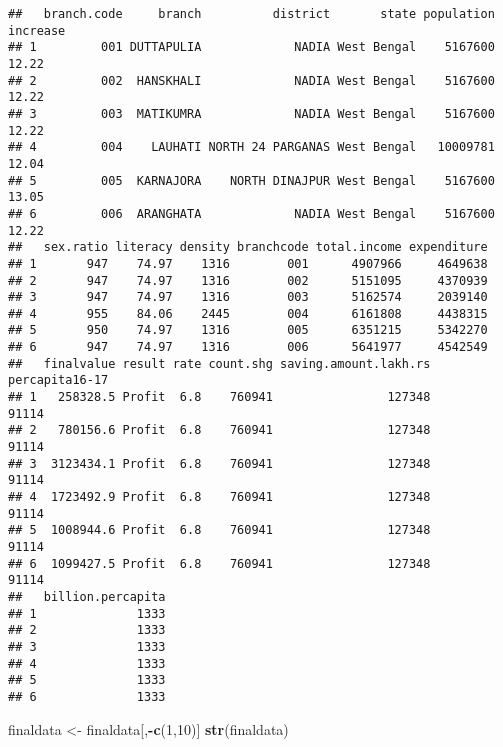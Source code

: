 \documentclass[]{article}
\newenvironment{Shaded}{\begin{snugshade}}{\end{snugshade}}
\newcommand{\KeywordTok}[1]{\textcolor[rgb]{0.13,0.29,0.53}{\textbf{#1}}}
\newcommand{\DecValTok}[1]{\textcolor[rgb]{0.00,0.00,0.81}{#1}}
\newcommand{\StringTok}[1]{\textcolor[rgb]{0.31,0.60,0.02}{#1}}
\newcommand{\OperatorTok}[1]{\textcolor[rgb]{0.81,0.36,0.00}{\textbf{#1}}}
\newcommand{\NormalTok}[1]{#1}
\begin{document}
\begin{verbatim}
##   branch.code     branch          district       state population increase
## 1         001 DUTTAPULIA             NADIA West Bengal    5167600    12.22
## 2         002  HANSKHALI             NADIA West Bengal    5167600    12.22
## 3         003  MATIKUMRA             NADIA West Bengal    5167600    12.22
## 4         004    LAUHATI NORTH 24 PARGANAS West Bengal   10009781    12.04
## 5         005  KARNAJORA    NORTH DINAJPUR West Bengal    5167600    13.05
## 6         006  ARANGHATA             NADIA West Bengal    5167600    12.22
##   sex.ratio literacy density branchcode total.income expenditure
## 1       947    74.97    1316        001      4907966     4649638
## 2       947    74.97    1316        002      5151095     4370939
## 3       947    74.97    1316        003      5162574     2039140
## 4       955    84.06    2445        004      6161808     4438315
## 5       950    74.97    1316        005      6351215     5342270
## 6       947    74.97    1316        006      5641977     4542549
##   finalvalue result rate count.shg saving.amount.lakh.rs percapita16-17
## 1   258328.5 Profit  6.8    760941                127348          91114
## 2   780156.6 Profit  6.8    760941                127348          91114
## 3  3123434.1 Profit  6.8    760941                127348          91114
## 4  1723492.9 Profit  6.8    760941                127348          91114
## 5  1008944.6 Profit  6.8    760941                127348          91114
## 6  1099427.5 Profit  6.8    760941                127348          91114
##   billion.percapita
## 1              1333
## 2              1333
## 3              1333
## 4              1333
## 5              1333
## 6              1333
\end{verbatim}

\begin{Shaded}
\begin{Highlighting}[]
\NormalTok{finaldata <-}\StringTok{ }\NormalTok{finaldata[,}\OperatorTok{-}\KeywordTok{c}\NormalTok{(}\DecValTok{1}\NormalTok{,}\DecValTok{10}\NormalTok{)]}
\KeywordTok{str}\NormalTok{(finaldata)}
\end{Highlighting}
\end{Shaded}
\end{document}
